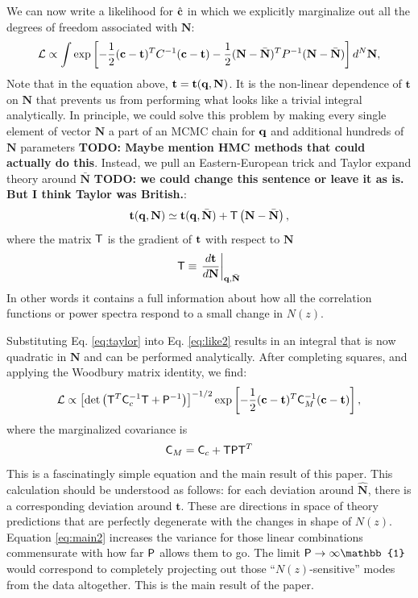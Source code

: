 \documentclass[a4paper,11pt]{article}
\newcommand{\todo}[1]{{\bf TODO: #1}}
\newcommand{\vt}{\mathbf{t}}
\newcommand{\vN}{\mathbf{N}}
\begin{document}
      We can now write a likelihood for $\hat{\bf c}$ in which we explicitly marginalize out all the degrees of freedom associated with $\vN$:
      \begin{equation}
        \mathcal{L} \propto  \int \exp\left [-\frac{1}{2} ({\bf c}-\vt)^T C^{-1} ({\bf c}-\vt) -\frac{1}{2} (\vN - \bar{\vN})^T P^{-1} (\vN -\bar{\vN}) \right]  d^N\vN, \label{eq:like2}
      \end{equation}
      Note that in the equation above, $\vt=\vt({\bf q},\vN)$. It is the non-linear dependence of $\vt$ on $\vN$ that prevents us from performing what looks like a trivial integral analytically. In principle, we could solve this problem by making every single element of vector $\vN$ a part of an MCMC chain for ${\bf q}$ and additional hundreds of $\vN$ parameters \todo{Maybe mention HMC methods that could actually do this}. Instead, we pull an Eastern-European trick and Taylor expand theory around $\bar{\vN}$ \todo{we could change this sentence or leave it as is. But I think Taylor was British.}:
      \begin{equation}
        \vt({\bf q},\vN) \simeq \vt({\bf q},\bar{\vN}) + {\sf T} \left(\vN - \bar{\vN} \right), \label{eq:taylor}
      \end{equation}
      where the matrix ${\sf T}$ is the gradient of ${\bf t}$ with respect to $\vN$
      \begin{equation}
        {\sf T}\equiv \left.\frac{d{\bf t}}{d\vN}\right|_{{\bf q},\bar{\vN}}
        \label{eq:Tmat}
      \end{equation}
      In other words it contains a full information about how all the correlation functions or power spectra respond to a small change in $N(z)$.

      Substituting Eq. \ref{eq:taylor} into Eq. \ref{eq:like2} results in an integral that is now quadratic in $\vN$ and can be performed analytically. After completing squares, and applying the Woodbury matrix identity, we find:
      \begin{equation}
        \mathcal{L} \propto \left[{\rm det}\left({\sf T}^T {\sf C}_c^{-1} {\sf T} +{\sf P}^{-1}\right)\right]^{-1/2} \exp\left [-\frac{1}{2} ({\bf c}-\vt)^T {\sf C}_M^{-1} ({\bf c}-\vt) \right], \label{eq:main1}
      \end{equation}
      where the  marginalized covariance is
      \begin{equation}
        {\sf C}_M = {\sf C}_c + {\sf T}{\sf P}{\sf T}^T \label{eq:main2}
      \end{equation}
      This is a fascinatingly simple equation and the main result of this paper. This calculation should be understood as follows: for each deviation around $\hat{\vN}$, there is a corresponding deviation around $\vt$. These are directions in space of theory predictions that are perfectly degenerate with the changes in shape of $N(z)$.  Equation \ref{eq:main2}  increases the variance for those linear combinations commensurate with how far ${\sf P}$ allows them to go. The limit ${\sf P}\rightarrow\infty\mathbb{1}$ would correspond to completely projecting out those ``$N(z)$-sensitive'' modes from the data altogether. This is the main result of the paper.
\end{document}
